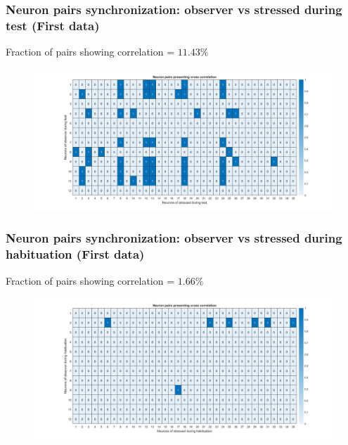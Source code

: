\documentclass{beamer}
\begin{document}
\begin{frame}
\frametitle{Neuron pairs synchronization: observer vs stressed during test (First data)}


Fraction of pairs showing correlation = $11.43 \%$


\begin{figure}[H]
	\begin{center}
		\hspace*{-1cm}
		\includegraphics[scale=.30]{cc_active.jpg} 
	\end{center}  
	
	
\end{figure}


\end{frame}	






\begin{frame}
\frametitle{Neuron pairs synchronization: observer vs stressed during habituation (First data)}


Fraction of pairs showing correlation = $1.66 \%$


\begin{figure}[H]
\begin{center}
	\hspace*{-1cm}
	\includegraphics[scale=.30]{cc_active2.jpg} 
\end{center}  


\end{figure}


\end{frame}	
\end{document}
